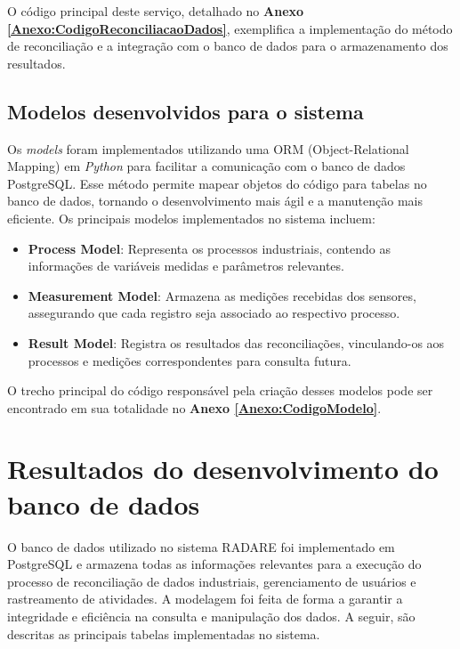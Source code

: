 O código principal deste serviço, detalhado no \textbf{Anexo \ref{Anexo:CodigoReconciliacaoDados}}, exemplifica a implementação do método de reconciliação e a integração com o banco de dados para o armazenamento dos resultados.

\subsection{Modelos desenvolvidos para o sistema}

Os \textit{models} foram implementados utilizando uma ORM (Object-Relational Mapping) em \textit{Python} para facilitar a comunicação com o banco de dados PostgreSQL. Esse método permite mapear objetos do código para tabelas no banco de dados, tornando o desenvolvimento mais ágil e a manutenção mais eficiente. Os principais modelos implementados no sistema incluem:

\begin{itemize}
    \item \textbf{Process Model}: Representa os processos industriais, contendo as informações de variáveis medidas e parâmetros relevantes.
    \item \textbf{Measurement Model}: Armazena as medições recebidas dos sensores, assegurando que cada registro seja associado ao respectivo processo.
    \item \textbf{Result Model}: Registra os resultados das reconciliações, vinculando-os aos processos e medições correspondentes para consulta futura.
\end{itemize}

O trecho principal do código responsável pela criação desses modelos pode ser encontrado em sua totalidade no \textbf{Anexo \ref{Anexo:CodigoModelo}}.

\section{Resultados do desenvolvimento do banco de dados}

O banco de dados utilizado no sistema RADARE foi implementado em PostgreSQL e armazena todas as informações relevantes para a execução do processo de reconciliação de dados industriais, gerenciamento de usuários e rastreamento de atividades. A modelagem foi feita de forma a garantir a integridade e eficiência na consulta e manipulação dos dados. A seguir, são descritas as principais tabelas implementadas no sistema.

